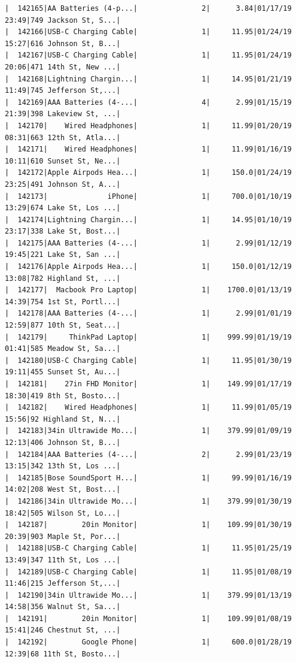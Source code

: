\documentclass[
  letterpaper,
  DIV=11,
  numbers=noendperiod]{scrartcl}
\begin{document}
\begin{verbatim}
|  142165|AA Batteries (4-p...|               2|      3.84|01/17/19 23:49|749 Jackson St, S...|
|  142166|USB-C Charging Cable|               1|     11.95|01/24/19 15:27|616 Johnson St, B...|
|  142167|USB-C Charging Cable|               1|     11.95|01/24/19 20:06|471 14th St, New ...|
|  142168|Lightning Chargin...|               1|     14.95|01/21/19 11:49|745 Jefferson St,...|
|  142169|AAA Batteries (4-...|               4|      2.99|01/15/19 21:39|398 Lakeview St, ...|
|  142170|    Wired Headphones|               1|     11.99|01/20/19 08:31|663 12th St, Atla...|
|  142171|    Wired Headphones|               1|     11.99|01/16/19 10:11|610 Sunset St, Ne...|
|  142172|Apple Airpods Hea...|               1|     150.0|01/24/19 23:25|491 Johnson St, A...|
|  142173|              iPhone|               1|     700.0|01/10/19 13:29|674 Lake St, Los ...|
|  142174|Lightning Chargin...|               1|     14.95|01/10/19 23:17|338 Lake St, Bost...|
|  142175|AAA Batteries (4-...|               1|      2.99|01/12/19 19:45|221 Lake St, San ...|
|  142176|Apple Airpods Hea...|               1|     150.0|01/12/19 13:08|782 Highland St, ...|
|  142177|  Macbook Pro Laptop|               1|    1700.0|01/13/19 14:39|754 1st St, Portl...|
|  142178|AAA Batteries (4-...|               1|      2.99|01/01/19 12:59|877 10th St, Seat...|
|  142179|     ThinkPad Laptop|               1|    999.99|01/19/19 01:41|585 Meadow St, Sa...|
|  142180|USB-C Charging Cable|               1|     11.95|01/30/19 19:11|455 Sunset St, Au...|
|  142181|    27in FHD Monitor|               1|    149.99|01/17/19 18:30|419 8th St, Bosto...|
|  142182|    Wired Headphones|               1|     11.99|01/05/19 15:56|92 Highland St, N...|
|  142183|34in Ultrawide Mo...|               1|    379.99|01/09/19 12:13|406 Johnson St, B...|
|  142184|AAA Batteries (4-...|               2|      2.99|01/23/19 13:15|342 13th St, Los ...|
|  142185|Bose SoundSport H...|               1|     99.99|01/16/19 14:02|208 West St, Bost...|
|  142186|34in Ultrawide Mo...|               1|    379.99|01/30/19 18:42|505 Wilson St, Lo...|
|  142187|        20in Monitor|               1|    109.99|01/30/19 20:39|903 Maple St, Por...|
|  142188|USB-C Charging Cable|               1|     11.95|01/25/19 13:49|347 11th St, Los ...|
|  142189|USB-C Charging Cable|               1|     11.95|01/08/19 11:46|215 Jefferson St,...|
|  142190|34in Ultrawide Mo...|               1|    379.99|01/13/19 14:58|356 Walnut St, Sa...|
|  142191|        20in Monitor|               1|    109.99|01/08/19 15:41|246 Chestnut St, ...|
|  142192|        Google Phone|               1|     600.0|01/28/19 12:39|68 11th St, Bosto...|

\end{verbatim}
\end{document}
